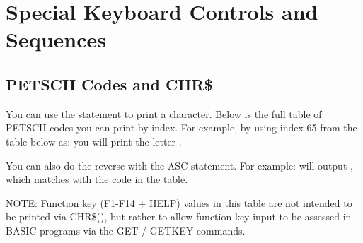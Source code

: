 \chapter{Special Keyboard Controls and Sequences}


\section{PETSCII Codes and CHR\$}

\label{appendix:asciicodes}

You can use the  statement to print a character.
Below is the full table of PETSCII codes you can print by index.  For example, by
using index 65 from the table below as:  you will
print the letter .

You can also do the reverse with the ASC statement.  For example:
 will output , which matches with the
code in the table.

NOTE: Function key (F1-F14 + HELP) values in this table are not intended to be printed via CHR\$(), but rather to allow function-key input to be assessed in BASIC programs via the GET / GETKEY commands.

